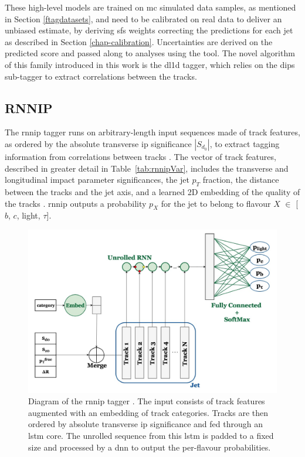 These high-level models are trained on \gls{mc} simulated data samples, as mentioned in Section \ref{ftagdatasets}, and need to be calibrated on real data to deliver an unbiased estimate, by deriving \glspl{sf} weights correcting the predictions for each jet as described in Section \ref{chap-calibration}. Uncertainties are derived on the predicted score and passed along to analyses using the tool. The novel algorithm of this family introduced in this work is the \gls{dl1d} tagger, which relies on the \gls{dips} sub-tagger to extract correlations between the tracks.  

\subsection{RNNIP}
The \gls{rnnip} tagger runs on arbitrary-length input sequences made of track features, as ordered by the absolute transverse \gls{ip} significance $|S_{d_0}|$, to extract tagging information from correlations between tracks \cite{ATL-PHYS-PUB-2017-003}. The vector of track features, described in greater detail in Table~\ref{tab:rnnipVar}, includes the transverse and longitudinal impact parameter significances, the jet $p_T$ fraction, the distance between the tracks and the jet axis, and a learned 2D embedding of the quality of the tracks \cite{Paganini:2289214}. \gls{rnnip} outputs a probability $p_X$ for the jet to belong to flavour $X$ $\in$ [$b$, $c$, light, $\tau$].

\begin{figure}[h!]
  \center
  \includegraphics[scale=0.6]{Images/FTAG/rnnip_structure.png}
  \caption{Diagram of the \gls{rnnip} tagger \cite{Paganini:2289214}. The input consists of track features augmented with an embedding of track categories. Tracks are then ordered by absolute transverse \gls{ip} significance and fed through an \gls{lstm} core. The unrolled sequence from this \gls{lstm} is padded to a fixed size and processed by a \gls{dnn} to output the per-flavour probabilities.} 
  \label{fig:rnnipModel}
\end{figure}

